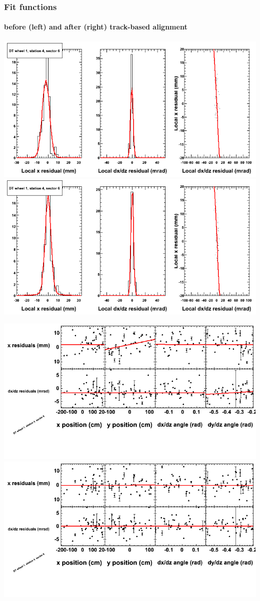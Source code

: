 \documentclass[compress]{beamer}
\begin{document}
\begin{frame}
\frametitle{Fit functions}
\framesubtitle{before (left) and after (right) track-based alignment}
\includegraphics[width=0.5\linewidth]{fitfunctions_re01/MBwhDst4sec06_bellcurves.png} \includegraphics[width=0.5\linewidth]{fitfunctions_re05/MBwhDst4sec06_bellcurves.png}

\includegraphics[width=0.5\linewidth]{fitfunctions_re01/MBwhDst4sec06_polynomials.png} \includegraphics[width=0.5\linewidth]{fitfunctions_re05/MBwhDst4sec06_polynomials.png}
\end{frame}
\end{document}
